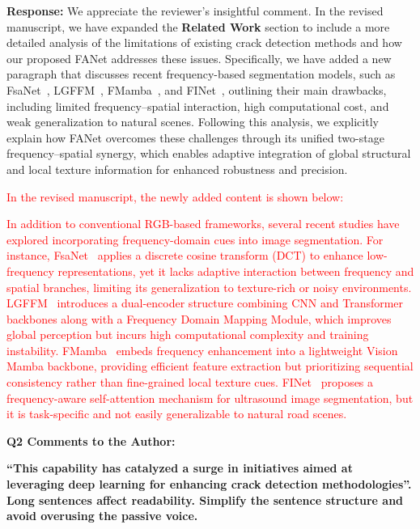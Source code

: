 \documentclass[lettersize,journal,onecolumn,12pt]{IEEEtran}
\begin{document}
\textbf{Response:}
We appreciate the reviewer’s insightful comment. 
In the revised manuscript, we have expanded the \textbf{Related Work} section to include a more detailed analysis of the limitations of existing crack detection methods and how our proposed FANet addresses these issues. 
Specifically, we have added a new paragraph that discusses recent frequency-based segmentation models, such as FsaNet~\cite{DBLP:journals/tip/ZhangPG23}, LGFFM~\cite{11129883TMI}, FMamba~\cite{DBLP:journals/tim/LiuLLWZS25}, and FINet~\cite{DBLP:journals/tcsv/WangZZGY25}, outlining their main drawbacks, including limited frequency–spatial interaction, high computational cost, and weak generalization to natural scenes. Following this analysis, we explicitly explain how FANet overcomes these challenges through its unified two-stage frequency–spatial synergy, which enables adaptive integration of global structural and local texture information for enhanced robustness and precision.

\textcolor{red} {In the revised manuscript, the newly added content is shown below:}


\textcolor{red}{
In addition to conventional RGB-based frameworks, several recent studies have explored incorporating frequency-domain cues into image segmentation. 
For instance, FsaNet~\cite{DBLP:journals/tip/ZhangPG23} applies a discrete cosine transform (DCT) to enhance low-frequency representations, 
yet it lacks adaptive interaction between frequency and spatial branches, limiting its generalization to texture-rich or noisy environments. 
LGFFM~\cite{11129883TMI} introduces a dual-encoder structure combining CNN and Transformer backbones along with a Frequency Domain Mapping Module, 
which improves global perception but incurs high computational complexity and training instability. 
FMamba~\cite{DBLP:journals/tim/LiuLLWZS25} embeds frequency enhancement into a lightweight Vision Mamba backbone, 
providing efficient feature extraction but prioritizing sequential consistency rather than fine-grained local texture cues. 
FINet~\cite{DBLP:journals/tcsv/WangZZGY25} proposes a frequency-aware self-attention mechanism for ultrasound image segmentation, 
but it is task-specific and not easily generalizable to natural road scenes.
}
\\ [10pt]



{\color{BlueGreen} \textbf{Q2 Comments to the Author:}

\textbf{“This capability has catalyzed a surge in initiatives aimed at leveraging deep learning for enhancing crack detection methodologies”. Long sentences affect readability. Simplify the sentence structure and avoid overusing the passive voice.}} 
\end{document}
